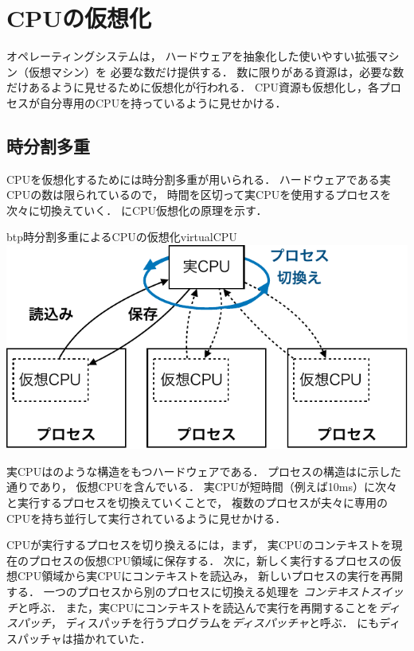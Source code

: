 \chapter{CPUの仮想化}
オペレーティングシステムは，
ハードウェアを抽象化した使いやすい拡張マシン（仮想マシン）を
必要な数だけ提供する．
数に限りがある資源は，必要な数だけあるように見せるために仮想化が行われる．
CPU資源も仮想化し，各プロセスが自分専用のCPUを持っているように見せかける．

\section{時分割多重}
CPUを仮想化するためには時分割多重が用いられる．
ハードウェアである実CPUの数は限られているので，
時間を区切って実CPUを使用するプロセスを次々に切換えていく．
にCPU仮想化の原理を示す．

\begin{myfig}{btp}{時分割多重によるCPUの仮想化}{virtualCPU}
  \includegraphics[scale=0.7]{Fig/virtualCPU-crop.pdf}
\end{myfig}

実CPUはのような構造をもつハードウェアである．
プロセスの構造はに示した通りであり，
仮想CPUを含んでいる．
実CPUが短時間（例えば10ms）に次々と実行するプロセスを切換えていくことで，
複数のプロセスが夫々に専用のCPUを持ち並行して実行されているように見せかける．

CPUが実行するプロセスを切り換えるには，まず，
実CPUのコンテキストを現在のプロセスの仮想CPU領域に保存する．
次に，新しく実行するプロセスの仮想CPU領域から実CPUにコンテキストを読込み，
新しいプロセスの実行を再開する．
一つのプロセスから別のプロセスに切換える処理を
\emph{コンテキストスイッチ}と呼ぶ．
また，実CPUにコンテキストを読込んで実行を再開することを\emph{ディスパッチ}，
ディスパッチを行うプログラムを\emph{ディスパッチャ}と呼ぶ．
にもディスパッチャは描かれていた．

